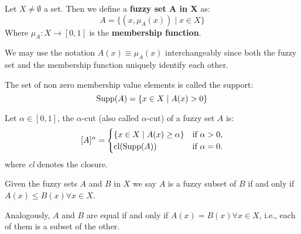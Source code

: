 \begin{definition}
    Let $X\neq\emptyset$ a set. Then we define a \textbf{fuzzy set A in X} as:
    \[A=\{(x,\mu_A(x))\mid x\in X\}\]
    Where $\mu_A:X\longrightarrow [0,1]$ is the \textbf{membership function}.
\end{definition}

\begin{remark}
    We may use the notation \( A(x) \equiv \mu_A(x) \) interchangeably since both the fuzzy set and the membership function uniquely identify each other.
\end{remark}

\begin{definition}[Support]
    The set of non zero membership value elements is called the support:
    \[\textnormal{Supp}(A)=\{x\in X \mid A(x)>0\}\]
\end{definition}

\begin{definition}
    Let $\alpha \in [0,1]$, the $\alpha$-cut (also called $\alpha$-cut) of a fuzzy set \( A \) is:
    \[
    [A]^\alpha =
    \begin{cases}
    \{x \in X \mid A(x)\geq \alpha\} & \text{if } \alpha > 0, \\
    \textnormal{cl}(\textnormal{Supp}(A)) & \text{if } \alpha = 0.
    \end{cases}
    \]
    where \textit{cl} denotes the closure.
\end{definition}



\begin{definition}
    Given the fuzzy sets $A$ and $B$ in $X$ we say $A$ is a fuzzy subset of $B$ if and only if $A(x)
    \leq B(x) \forall x \in X$.

    Analogously, $A$ and $B$ are equal if and only if $A(x)=B(x) \forall x \in X$, i.e., each of them is a subset of the other.
\end{definition}

